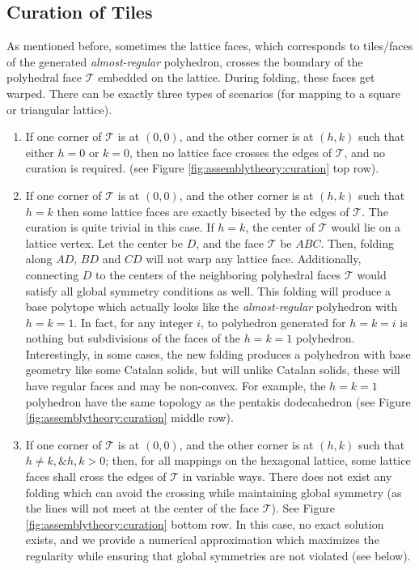 \documentclass[11pt]{article}
\newcommand{\1}{\mathds{1}}
\begin{document}
\subsection{Curation of Tiles}
\label{sec:assemblytheory:optimization}
As mentioned before, sometimes the lattice faces, which corresponds to tiles/faces of the generated \emph{almost-regular} polyhedron, crosses the boundary of the polyhedral face $\mathcal{T}$ embedded on the lattice. During folding, these faces get warped. There can be exactly three types of scenarios (for mapping to a square or triangular lattice).

\begin{enumerate}
 \item If one corner of $\mathcal{T}$ is at $(0,0)$, and the other corner is at $(h,k)$ such that either $h=0$ or $k=0$, then no lattice face crosses the edges of $\mathcal{T}$, and no curation is required. (see Figure \ref{fig:assemblytheory:curation} top row).
 \item If one corner of $\mathcal{T}$ is at $(0,0)$, and the other corner is at $(h,k)$ such that $h=k$ then some lattice faces are exactly bisected by the edges of $\mathcal{T}$. The curation is quite trivial in this case. If $h=k$, the center of $\mathcal{T}$ would lie on a lattice vertex. Let the center be $D$, and the face $\mathcal{T}$ be $ABC$. Then, folding along $AD$, $BD$ and $CD$ will not warp any lattice face. Additionally, connecting $D$ to the centers of the neighboring polyhedral faces $\mathcal{T}$ would satisfy all global symmetry conditions as well. This folding will produce a base polytope which actually looks like the \emph{almost-regular} polyhedron with $h=k=1$. In fact, for any integer $i$, to polyhedron generated for $h=k=i$ is nothing but subdivisions of the faces of the $h=k=1$ polyhedron. Interestingly, in some cases, the new folding produces a polyhedron with base geometry like some Catalan solids, but will unlike Catalan solids, these will have regular faces and may be non-convex. For example, the $h=k=1$ polyhedron have the same topology as the pentakis dodecahedron (see Figure \ref{fig:assemblytheory:curation} middle row).
 \item If one corner of $\mathcal{T}$ is at $(0,0)$, and the other corner is at $(h,k)$ such that $h\neq k, \& h,k>0$; then, for all mappings on the hexagonal lattice, some lattice faces shall cross the edges of $\mathcal{T}$ in variable ways. There does not exist any folding which can avoid the crossing while maintaining global symmetry (as the lines will not meet at the center of the face $\mathcal{T}$). See Figure \ref{fig:assemblytheory:curation} bottom row. In this case, no exact solution exists, and we provide a numerical approximation which maximizes the regularity while ensuring that global symmetries are not violated (see below). 
\end{enumerate}
\end{document}
